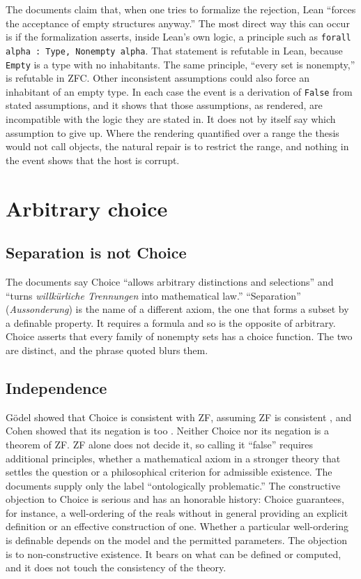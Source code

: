 \documentclass[11pt]{article}
\begin{document}
The documents claim that, when one tries to formalize the rejection, Lean ``forces the acceptance of empty structures anyway.'' The most direct way this can occur is if the formalization asserts, inside Lean's own logic, a principle such as \texttt{forall alpha : Type, Nonempty alpha}. That statement is refutable in Lean, because \texttt{Empty} is a type with no inhabitants. The same principle, ``every set is nonempty,'' is refutable in ZFC. Other inconsistent assumptions could also force an inhabitant of an empty type. In each case the event is a derivation of \texttt{False} from stated assumptions, and it shows that those assumptions, as rendered, are incompatible with the logic they are stated in. It does not by itself say which assumption to give up. Where the rendering quantified over a range the thesis would not call objects, the natural repair is to restrict the range, and nothing in the event shows that the host is corrupt.

\section{Arbitrary choice}

\subsection{Separation is not Choice}

The documents say Choice ``allows arbitrary distinctions and selections'' and ``turns \emph{willk\"urliche Trennungen} into mathematical law.'' ``Separation'' (\emph{Aussonderung}) is the name of a different axiom, the one that forms a subset by a definable property. It requires a formula and so is the opposite of arbitrary. Choice asserts that every family of nonempty sets has a choice function. The two are distinct, and the phrase quoted blurs them.

\subsection{Independence}

G\"odel showed that Choice is consistent with ZF, assuming ZF is consistent \cite{godel1938}, and Cohen showed that its negation is too \cite{cohen1963}. Neither Choice nor its negation is a theorem of ZF. ZF alone does not decide it, so calling it ``false'' requires additional principles, whether a mathematical axiom in a stronger theory that settles the question or a philosophical criterion for admissible existence. The documents supply only the label ``ontologically problematic.'' The constructive objection to Choice is serious and has an honorable history: Choice guarantees, for instance, a well-ordering of the reals without in general providing an explicit definition or an effective construction of one. Whether a particular well-ordering is definable depends on the model and the permitted parameters. The objection is to non-constructive existence. It bears on what can be defined or computed, and it does not touch the consistency of the theory.
\end{document}
